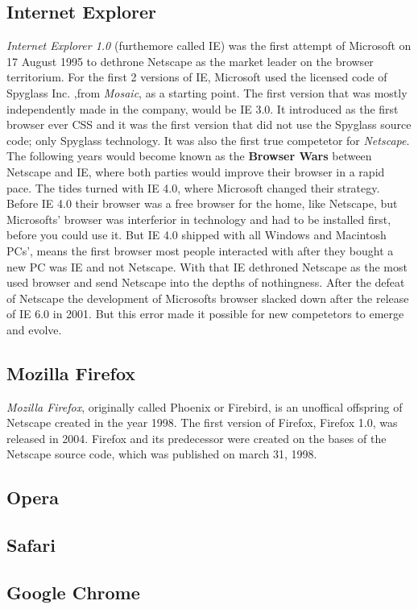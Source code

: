 \documentclass[runningheads]{llncs}
\begin{document}
		\subsection{Internet Explorer}
		\textit{Internet Explorer 1.0} (furthemore called IE) was the first attempt of Microsoft on 17 August 1995 to dethrone Netscape as the market leader on the browser territorium. For the first 2 versions of IE, Microsoft used the licensed code of Spyglass Inc. ,from \textit{Mosaic}, as a starting point. The first version that was mostly independently made in the company, would be IE 3.0. It introduced as the first browser ever CSS and it was the first version that did not use the Spyglass source code; only Spyglass technology. It was also the first true competetor for \textit{Netscape}. The following years would become known as the \textbf{Browser Wars} between Netscape and IE, where both parties would improve their browser in a rapid pace. The tides turned with IE 4.0, where Microsoft changed their strategy. Before IE 4.0 their browser was a free browser for the home, like Netscape, but Microsofts' browser was interferior in technology and had to be installed first, before you could use it. But IE 4.0 shipped with all Windows and Macintosh PCs', means the first browser most people interacted with after they bought a new PC was IE and not Netscape. With that IE dethroned Netscape as the most used browser and send Netscape into the depths of nothingness. After the defeat of Netscape the development of Microsofts browser slacked down after the release of IE 6.0 in 2001. But this error made it possible for new competetors to emerge and evolve.
		\subsection{Mozilla Firefox}
		\textit{Mozilla Firefox}, originally called Phoenix or Firebird, is an unoffical offspring of Netscape created in the year 1998. The first version of Firefox, Firefox 1.0, was released in 2004. Firefox and its predecessor were created on the bases of the Netscape source code, which was published on march 31, 1998. 
		\subsection{Opera}
		\subsection{Safari}
		\subsection{Google Chrome}
\end{document}
